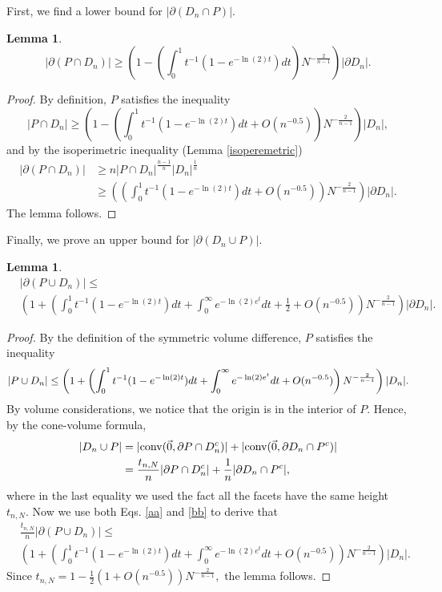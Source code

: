 \documentclass[10pt, twoside, leqno]{article}
\newtheorem{lemma}[thm]{Lemma}
\theoremstyle{definition}
\numberwithin{equation}{section}
\newcommand{\be}{\begin{equation}}
\newcommand{\ee}{\end{equation}}
\newcommand{\NN}{N^{-\frac 2{n-1} }}
\begin{document}
First, we find a lower bound for $ |\partial\left(D_n \cap P\right)|.$
\begin{lemma}{\label{lem1}}
	\be
	|\partial\left(P\cap D_n\right)| \geq  \left(1  - \left(\int_{0}^{1} t^{-1}(1-e^{-\ln(2)t})dt\right)\NN\right)|\partial D_n|.
	\ee
\end{lemma}
\begin{proof}
	 By definition, $ P $ satisfies the inequality
	\[|P\cap D_n| \geq \left(1  -\left(\int_{0}^{1} t^{-1}(1-e^{-\ln(2)t})dt + O(n^{-0.5})\right)\NN\right)|D_n|,\] and by the isoperimetric inequality (Lemma \ref{isoperemetric}) 
	\begin{equation*}
	\begin{aligned}
	|\partial\left(P\cap D_n\right)| &\geq n|P\cap D_n|^{\frac{n-1}{n}}|D_n|^{\frac {{1}}{n}}\\&\geq \left(\left(\int_{0}^{1} t^{-1}(1-e^{-\ln(2)t})dt  + O(n^{-0.5})\right)\NN\right)|\partial D_n|.
	\end{aligned}
	\end{equation*}
	 The lemma follows.
\end{proof}
Finally, we prove an upper bound for $ |\partial\left(D_n\cup P\right)| $.
\begin{lemma}{\label{lem2}}
	\be
	\begin{aligned} & |\partial\left(P\cup D_{n}\right)|\leq \\&\left(1+ \left(\int_{0}^{1} t^{-1}(1-e^{-\ln(2)t})dt + \int_{0}^{\infty}e^{-\ln(2)e^{t}}dt + \frac{1}{2} +O(n^{-0.5})\right)\NN\right)|\partial D_{n}|.
	\end{aligned}
	\ee
\end{lemma}
\begin{proof}
	By the definition of the symmetric volume difference, $ P $ satisfies the inequality
	\begin{equation}{\label{aa}}
	|P \cup D_n| \leq \left(1+ \left(\int_{0}^{1} t^{-1}(1-e^{-\ln(2)t})dt + \int_{0}^{\infty}e^{-\ln(2)e^{t}}dt + O(n^{-0.5})\right)\NN\right)|D_n|.
	\end{equation}
	By volume considerations, we notice that the origin is in the interior of $ P$. Hence, by the cone-volume formula,
	\begin{equation}{\label{bb}}
	\begin{aligned}
	|D_{n}\cup P|&= |\text{conv}(\vec{0},\partial P \cap D^c_{n})| + |\text{conv}(\vec{0},\partial D_{n}\cap P^c)| \\&= \frac{t_{n,N}}{n}|\partial P \cap D^c_{n}|+{\frac {{1}}{n}}|\partial D_{n}\cap P^c|,
	\end{aligned}
	\end{equation}
	where in the last equality we used the fact all the facets have the same height $ t_{n,N}.$  
	Now we use both Eqs. \eqref{aa} and \eqref{bb}  to derive that
	\begin{align*}
	&\frac {t_{n,N}}{n}|\partial\left(P \cup D_n\right)| \leq 
	\\&\left(1+ \left(\int_{0}^{1} t^{-1}(1-e^{-\ln(2)t})dt + \int_{0}^{\infty}e^{-\ln(2)e^{t}}dt + O(n^{-0.5})\right)\NN\right)|D_n|.
	\end{align*}
	Since $ t_{n,N}= {1-\frac 12\left(1+O\left(n^{-0.5}\right)\right)\NN},$ the lemma follows.
\end{proof}
\end{document}
